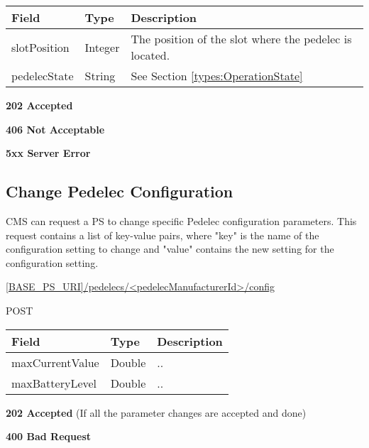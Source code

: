 \begin{table}[!h]
\vspace{-7mm}
\begin{tabularx}{\linewidth}{ | l | l | X | }
  \hline
  \rowcolor{table-head}
  Field & Type & Description \\
  \hline
  slotPosition	& Integer & The position of the slot where the pedelec is located. \\
  pedelecState 			& String & See Section \ref{types:OperationState} \\
  \hline
\end{tabularx}
\end{table}

 \textbf{202 Accepted}

 \textbf{406 Not Acceptable}

\textbf{5xx Server Error}

\subsection{Change Pedelec Configuration}
\label{cms:change-pedelec-conf}

\acs{CMS} can request a \acs{PS} to change specific Pedelec configuration parameters. This request contains a list of key-value pairs, where "key" is the name of the configuration setting to change and "value" contains the new setting for the configuration setting.

 \url{[BASE_PS_URI]/pedelecs/<pedelecManufacturerId>/config}

 POST

\newpage
{} 
\begin{table}[!h]
\vspace{-7mm}
\begin{tabularx}{\linewidth}{ | l | l | X | }
  \hline
  \rowcolor{table-head}
  Field  & Type & Description \\
  \hline
	maxCurrentValue & Double & .. \\
	maxBatteryLevel & Double & .. \\
  \hline
\end{tabularx}
\end{table}

\textbf{202 Accepted} (If all the parameter changes are accepted and done)

 \textbf{400 Bad Request}

